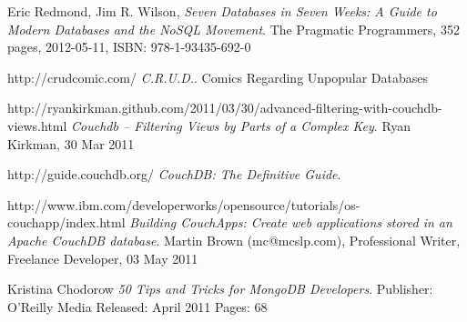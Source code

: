 \renewcommand\bibname{References}

\begin{thebibliography}{9}

  Eric Redmond, Jim R. Wilson,
  \emph{Seven Databases in Seven Weeks: A Guide to Modern Databases and the NoSQL Movement}.
  The Pragmatic Programmers,
  352 pages, 2012-05-11, 
  ISBN: 978-1-93435-692-0
  
  http://crudcomic.com/
  \emph{C.R.U.D.}.
  Comics Regarding Unpopular Databases
  
  http://ryankirkman.github.com/2011/03/30/advanced-filtering-with-couchdb-views.html
  \emph{Couchdb – Filtering Views by Parts of a Complex Key}.
  Ryan Kirkman, 30 Mar 2011

  http://guide.couchdb.org/
  \emph{CouchDB: The Definitive Guide}.  
  
  http://www.ibm.com/developerworks/opensource/tutorials/os-couchapp/index.html
  \emph{Building CouchApps: Create web applications stored in an Apache CouchDB database}.
  Martin Brown (mc@mcslp.com), Professional Writer, Freelance Developer, 
  03 May 2011
  
  Kristina Chodorow
  \emph{50 Tips and Tricks for MongoDB Developers}.
  Publisher: O'Reilly Media
  Released: April 2011
  Pages: 68

\end{thebibliography}